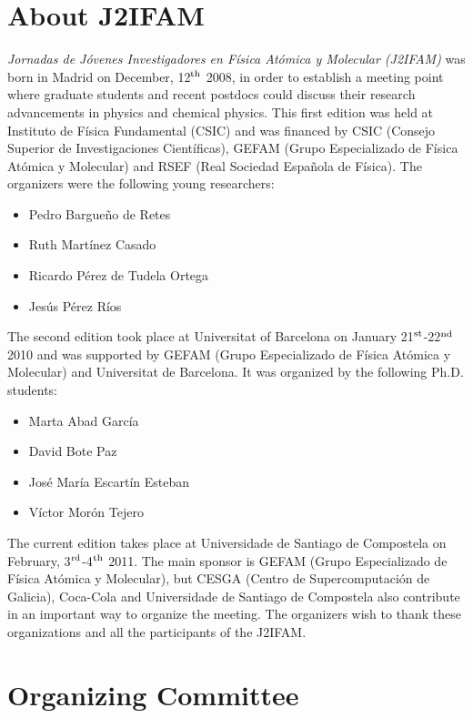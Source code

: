 \documentclass [12pt,a4paper,twoside] {book}
\begin{document}
\chapter*{About J2IFAM}

{\it Jornadas de Jóvenes Investigadores en Física Atómica y Molecular (J2IFAM)} was born in Madrid on December, 12$^{\rm th}$ 2008, in order to establish a meeting point where graduate students and recent postdocs could discuss their research advancements in physics and chemical physics. This first edition was held at Instituto de Física Fundamental (CSIC) and was financed by CSIC (Consejo Superior de Investigaciones Científicas), GEFAM (Grupo Especializado de Física Atómica y Molecular) and RSEF (Real Sociedad Española de Física). The organizers were the following young researchers:

\begin{itemize}
\item Pedro Bargueño de Retes
\item Ruth Martínez Casado
\item Ricardo Pérez de Tudela Ortega
\item Jesús Pérez Ríos
\end{itemize}

The second edition took place at Universitat of Barcelona on January 21$^{\rm st}$-22$^{\rm nd}$ 2010 and was supported by GEFAM (Grupo Especializado de Física Atómica y Molecular) and Universitat de Barcelona. It was organized by the following Ph.D. students:

\begin{itemize}
\item Marta Abad García
\item David Bote Paz
\item José María Escartín Esteban
\item Víctor Morón Tejero
\end{itemize}

The current edition takes place at Universidade de Santiago de Compostela on February, 3$^{\rm rd}$-4$^{\rm th}$ 2011. The main sponsor is GEFAM (Grupo Especializado de Física Atómica y Molecular), but CESGA (Centro de Supercomputación de Galicia), Coca-Cola and Universidade de Santiago de Compostela also contribute in an important way to organize the meeting. The organizers wish to thank these organizations and all the participants of  the J2IFAM.   

\chapter*{Organizing Committee}
\end{document}

